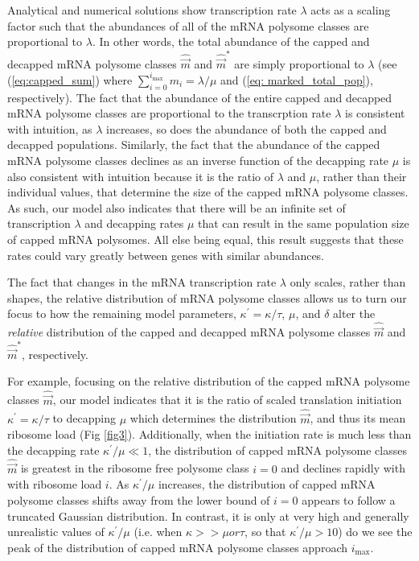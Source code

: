 \documentclass[10pt,letterpaper]{article}
\newcommand{\imax}{\ensuremath{{i_{\max}}}\xspace}
\newcommand{\kappaprime}{\ensuremath{\kappa^{\prime}}\xspace}
\newcommand{\mvec}{\ensuremath{\vec{m}}\xspace}
\newcommand{\mvechat}{\ensuremath{\hat{\mvec}}\xspace}
\newcommand{\mvechatstar}{\ensuremath{\mvechat^*}\xspace}
\begin{document}
Analytical and numerical solutions show transcription rate $\lambda$ acts as a scaling factor such that the abundances of all of the mRNA polysome classes are proportional to $\lambda$.
 In other words, the total abundance of the capped and decapped mRNA polysome classes $\mvechat$ and $\mvechatstar$ are simply proportional to $\lambda$ (see (\ref{eq:capped_sum}) where $\sum_{i = 0} ^\imax m_i = \lambda/\mu$ and (\ref{eq: marked_total_pop}), respectively).
  The fact that the abundance of the entire capped and decapped mRNA polysome classes are proportional to the transcrption rate $\lambda$ is consistent with intuition, as $\lambda$ increases, so does the abundance of both the capped and decapped populations.
  Similarly, the fact that the abundance of the capped mRNA polysome classes declines as an inverse function of the decapping rate $\mu$ is also consistent with intuition
  because it is the ratio of $\lambda$ and $\mu$, rather than their individual values, that determine the size of the capped mRNA polysome classes. As such, our model also indicates that there will be an infinite set of transcription $\lambda$ and decapping rates $\mu$ that can result in the same population size of capped mRNA polysomes.
  All else being equal, this result suggests that these rates could vary greatly between genes with similar abundances.


The fact that changes in the mRNA transcription rate  $\lambda$ only scales, rather than shapes, the relative distribution of mRNA polysome classes allows us to turn our focus to how the remaining model parameters, $\kappaprime = \kappa/\tau$, $\mu$, and $\delta$ alter the \emph{relative} distribution of the capped and decapped mRNA polysome classes \mvechat and \mvechatstar, respectively.

For example, focusing on the relative distribution of the capped mRNA polysome classes $\mvechat$, our model indicates that it is the ratio of scaled translation initiation $\kappaprime = \kappa/\tau$ to decapping $\mu$ which determines the distribution \mvechat, and thus its mean ribosome load  (Fig \ref{fig3}).
    Additionally, when the initiation rate is much less than the decapping rate $\kappaprime/\mu \ll 1$, the distribution of capped mRNA polysome classes $\mvechat$ is greatest in the ribosome free polysome class $i=0$ and declines rapidly with with ribosome load $i$.
    As $\kappaprime/\mu$ increases, the distribution of capped mRNA polysome classes shifts away from the lower bound of $i = 0$ appears to follow a truncated Gaussian distribution.
    In contrast, it is only at very high and generally unrealistic values of $\kappaprime/\mu$ (i.e.  when $\kappa>>\mu or \tau$, so that $\kappaprime/\mu > 10$) do we see the peak of the distribution of capped mRNA polysome classes approach $\imax$.
\end{document}
